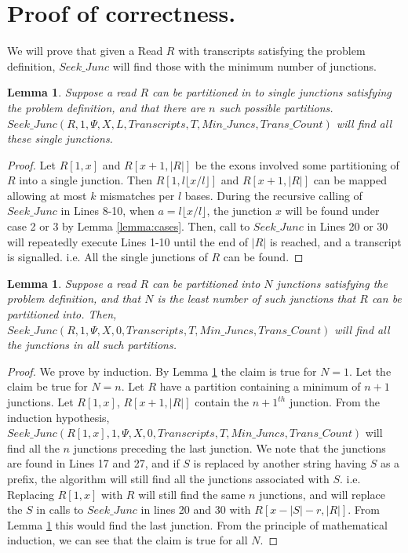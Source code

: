 \documentclass{article}
\newtheorem{lemma}[theorem]{Lemma}
\newcommand{\Floor}[1]{\ensuremath{\lfloor #1\rfloor}}
\begin{document}
\section {Proof of correctness.}
We will prove that given a Read $R$ with transcripts satisfying the problem definition, $Seek\_Junc$ will find those with the minimum number of junctions.
\begin{lemma}\label{lemma:first_junc}
	Suppose a read $R$ can be partitioned in to single junctions satisfying the problem definition, and that there are $n$ such possible partitions. $Seek\_Junc(R,1,\Psi,X,L,Transcripts,T,Min\_Juncs,Trans\_Count)$ will find all these single junctions.
\end{lemma}
\begin{proof}
	Let $R[1,x]$ and $R[x+1,|R|]$ be the exons involved some partitioning of $R$ into a single junction. Then $R[1,l\Floor{x/l}]$ and $R[x+1,|R|]$ can be mapped allowing at most $k$ mismatches per $l$ bases. During the recursive calling of $Seek\_Junc$ in Lines 8-10, when $a=l\Floor{x/l}$, the junction $x$ will be found under case 2 or 3 by Lemma \ref{lemma:cases}. Then, call to $Seek\_Junc$ in Lines 20 or 30 will repeatedly execute Lines 1-10 until the end of $|R|$ is reached, and a transcript is signalled. i.e. All the single junctions of $R$ can be found. %
\end{proof}

\begin{lemma}\label{lemma:all_junc}
	Suppose a read $R$ can be partitioned into $N$ junctions satisfying the problem definition, and that $N$ is the least number of such junctions that $R$ can be partitioned into. Then, $Seek\_Junc(R,1,\Psi,X,0,Transcripts,T,Min\_Juncs,Trans\_Count)$ will find all the junctions in all such partitions.
\end{lemma}
\begin{proof}
	We prove by induction. By Lemma \ref{lemma:first_junc} the claim is true for $N=1$. Let the claim be true for $N=n$. Let $R$ have a partition containing a minimum of $n+1$ junctions. Let $R[1,x]$, $R[x+1,|R|]$ contain the $n+1^{th}$ junction. From the induction hypothesis,$Seek\_Junc(R[1,x],1,\Psi,X,0,Transcripts,T,Min\_Juncs,Trans\_Count)$ will find all the $n$ junctions preceding the last junction. We note that the junctions are found in Lines 17 and 27, and if $S$ is replaced by another string having $S$ as a prefix, the algorithm will still find all the junctions associated with $S$. i.e. Replacing $R[1,x]$ with $R$ will still find the same $n$ junctions, and will replace the $S$ in calls to $Seek\_Junc$ in lines 20 and 30 with $R[x-|S|-r,|R|]$. From Lemma \ref{lemma:first_junc} this would find the last junction. From the principle of mathematical induction, we can see that the claim is true for all $N$.
\end{proof}
\end{document}
